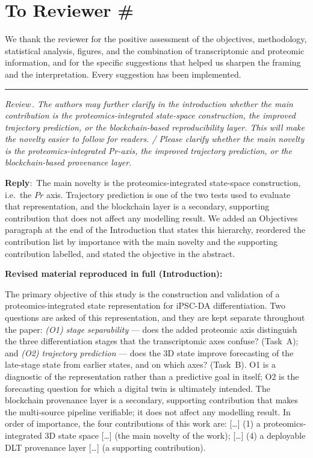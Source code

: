 \documentclass[11pt]{article}
\newcounter{reviewer}
\newcounter{point}[reviewer]
\renewcommand{\thepoint}{Review\,\thereviewer.\arabic{point}}
\newcommand{\point}[1]{\refstepcounter{point}  \bigskip \hrule \medskip \noindent \textit{{\fontseries{b}\selectfont \thepoint } #1}\par}
\newcommand{\reply}{\medskip \noindent \textbf{Reply}:\ }
\newcommand{\reviewersection}{\stepcounter{reviewer}
                  \section*{To Reviewer \#\thereviewer}}
\newcommand{\revisedheading}[1]{\medskip\noindent\textbf{Revised material
  reproduced in full (#1):}\par}
\newenvironment{revised}{\par\color{red}}{\par}
\begin{document}
\newpage
\reviewersection

We thank the reviewer for the positive assessment of the objectives, methodology, statistical analysis, figures, and the combination of transcriptomic and proteomic information, and for the specific suggestions that helped us sharpen the framing and the interpretation. Every suggestion has been implemented.

\point{The authors may further clarify in the introduction whether the main contribution is the proteomics-integrated state-space construction, the improved trajectory prediction, or the blockchain-based reproducibility layer. This will make the novelty easier to follow for readers. / Please clarify whether the main novelty is the proteomics-integrated Pr-axis, the improved trajectory prediction, or the blockchain-based provenance layer.}

\reply{The main novelty is the proteomics-integrated state-space construction, i.e.\ the $Pr$ axis. Trajectory prediction is one of the two tests used to evaluate that representation, and the blockchain layer is a secondary, supporting contribution that does not affect any modelling result. We added an Objectives paragraph at the end of the Introduction that states this hierarchy, reordered the contribution list by importance with the main novelty and the supporting contribution labelled, and stated the objective in the abstract.}

\revisedheading{Introduction}
\begin{revised}
The primary objective of this study is the construction and validation of a proteomics-integrated state representation for iPSC-DA differentiation. Two questions are asked of this representation, and they are kept separate throughout the paper: \textit{(O1) stage separability} --- does the added proteomic axis distinguish the three differentiation stages that the transcriptomic axes confuse? (Task~A); and \textit{(O2) trajectory prediction} --- does the 3D state improve forecasting of the late-stage state from earlier states, and on which axes? (Task~B). O1 is a diagnostic of the representation rather than a predictive goal in itself; O2 is the forecasting question for which a digital twin is ultimately intended. The blockchain provenance layer is a secondary, supporting contribution that makes the multi-source pipeline verifiable; it does not affect any modelling result. In order of importance, the four contributions of this work are: [\ldots] (1) a proteomics-integrated 3D state space [\ldots] (the main novelty of the work); [\ldots] (4) a deployable DLT provenance layer [\ldots] (a supporting contribution).
\end{revised}
\end{document}
